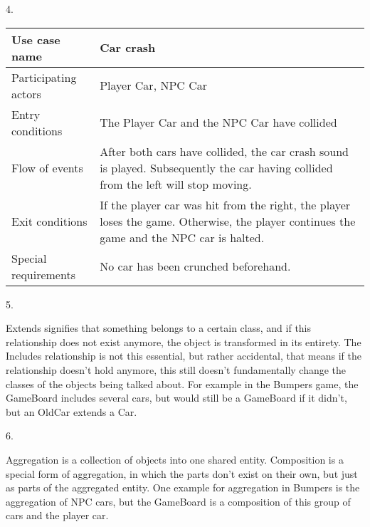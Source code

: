 \documentclass[11pt,a4paper]{article}
\begin{document}
4.

\begin{tabular}{l | p{100mm}}
Use case name & Car crash \\
\hline
Participating actors & Player Car, NPC Car \\
\hline
Entry conditions & The Player Car and the NPC Car have collided \\
\hline
Flow of events & After both cars have collided, the car crash sound is played. Subsequently the car having collided from the left will stop moving. \\
\hline
Exit conditions & If the player car was hit from the right, the player loses the game. Otherwise, the player continues the game and the NPC car is halted. \\
\hline
Special requirements & No car has been crunched beforehand. \\
\end{tabular}

5.

Extends signifies that something belongs to a certain class, and
if this relationship does not exist anymore, the object is transformed in
its entirety.  The Includes relationship is not this essential, but
rather accidental, that means if the relationship doesn't hold anymore,
this still doesn't fundamentally change the classes of the objects being
talked about. For example in the Bumpers game, the GameBoard includes
several cars, but would still be a GameBoard if it didn't, but an OldCar
extends a Car.

6.

Aggregation is a collection of objects into one shared entity. Composition
is a special form of aggregation, in which the parts don't exist on their
own, but just as parts of the aggregated entity. One example for aggregation
in Bumpers is the aggregation of NPC cars, but the GameBoard is a composition
of this group of cars and the player car.
\end{document}
